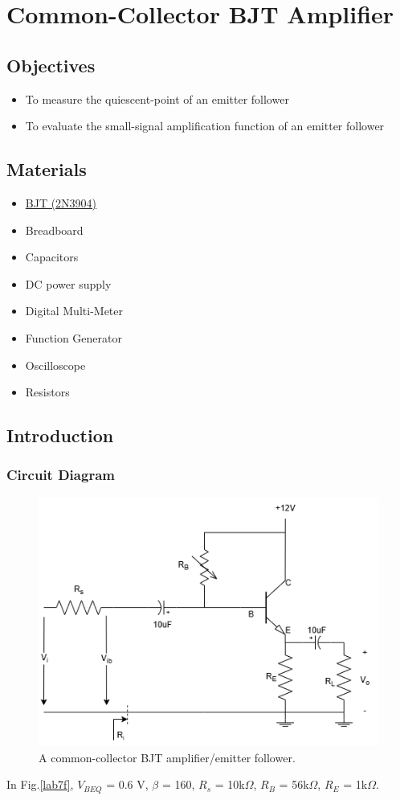 \chapter{Common-Collector BJT Amplifier}


\section{Objectives}
\begin{itemize}
    \item To measure the quiescent-point of an emitter follower
    \item To evaluate the small-signal amplification function of an emitter follower
\end{itemize}

\section{Materials}
\begin{itemize}
    \item \hyperref[2N3904_1]{BJT (2N3904)}
    \item Breadboard
    \item Capacitors
    \item DC power supply
    \item Digital Multi-Meter
    \item Function Generator
    \item Oscilloscope
    \item Resistors
\end{itemize}

\section{Introduction}
    \subsection{Circuit Diagram}
    \begin{figure}[h]
        \centering
        \includegraphics[width=0.7\linewidth]{Lab07/Lab7.drawio.png}
        \caption{A common-collector BJT amplifier/emitter follower.}
        \label{l7f}
    \end{figure}
    \FloatBarrier
In Fig.\ref{lab7f}, $V_{BEQ}$ = 0.6 V, $\beta$ = 160, $R_s$ = 10k$\Omega$, $R_B$ = 56k$\Omega$, $R_E$ = 1k$\Omega$.

